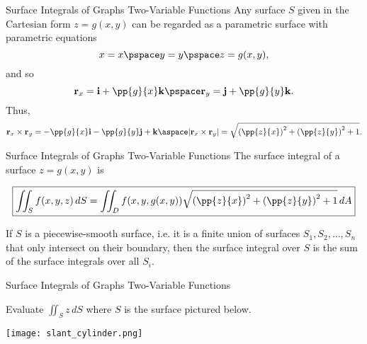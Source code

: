 \documentclass[11pt,english,
handout
]{beamer}
\begin{document}
\begin{frame}{Surface Integrals of Graphs Two-Variable Functions}
\small
Any surface $S$ given in the Cartesian form $z=g(x,y)$ can be regarded as a parametric surface with parametric equations
\[
x=x\pspace y=y\pspace z=g(x,y),
\]
and so
\[
\mathbf{r}_x=\mathbf{i}+\pp{g}{x}\mathbf{k}\pspace \mathbf{r}_y=\mathbf{j}+\pp{g}{y}\mathbf{k}.
\]
Thus,
\[
\mathbf{r}_x\times\mathbf{r}_y=-\pp{g}{x}\mathbf{i}-\pp{g}{y}\mathbf{j}+\mathbf{k}\aspace |\mathbf{r}_x\times\mathbf{r}_y|=\sqrt{\left(\pp{z}{x}\right)^2+\left(\pp{z}{y}\right)^2+1}.
\]
\end{frame}






\begin{frame}[t]{Surface Integrals of Graphs Two-Variable Functions}
\small
The surface integral of a surface $z=g(x,y)$ is

\[
\boxed{\iint_Sf(x,y,z)\,dS=\iint_Df(x,y,g(x,y))\sqrt{\left(\pp{z}{x}\right)^2+\left(\pp{z}{y}\right)^2+1}\,dA}
\]\pause 

\lspace
\begin{corollary}
If $S$ is a piecewise-smooth surface, i.e. it is a finite union of surfaces $S_1,S_2,\ldots,S_n$ that only intersect on their boundary, then the surface integral over $S$ is the sum of the surface integrals over all $S_i$.
\end{corollary}
\end{frame}












\begin{frame}[t]{Surface Integrals of Graphs Two-Variable Functions}
\small
\begin{example}
Evaluate $\iint_Sz\,dS$ where $S$ is the surface pictured below.

\begin{center}
\texttt{[image: slant\_cylinder.png]}
\end{center}
\end{example}
\end{frame}
\end{document}
